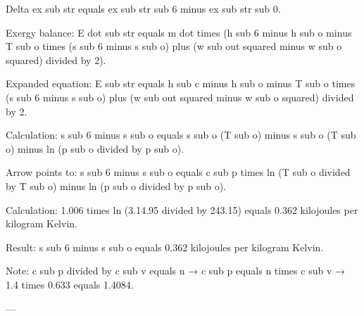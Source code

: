 Delta ex sub str equals ex sub str sub 6 minus ex sub str sub 0.  

Exergy balance:  
E dot sub str equals m dot times (h sub 6 minus h sub o minus T sub o times (s sub 6 minus s sub o) plus (w sub out squared minus w sub o squared) divided by 2).  

Expanded equation:  
E sub str equals h sub c minus h sub o minus T sub o times (s sub 6 minus s sub o) plus (w sub out squared minus w sub o squared) divided by 2.  

Calculation:  
s sub 6 minus s sub o equals s sub o (T sub o) minus s sub o (T sub o) minus ln (p sub o divided by p sub o).  

Arrow points to:  
s sub 6 minus s sub o equals c sub p times ln (T sub o divided by T sub o) minus ln (p sub o divided by p sub o).  

Calculation:  
1.006 times ln (3.14.95 divided by 243.15) equals 0.362 kilojoules per kilogram Kelvin.  

Result:  
s sub 6 minus s sub o equals 0.362 kilojoules per kilogram Kelvin.  

Note:  
c sub p divided by c sub v equals n → c sub p equals n times c sub v → 1.4 times 0.633 equals 1.4084.  

---